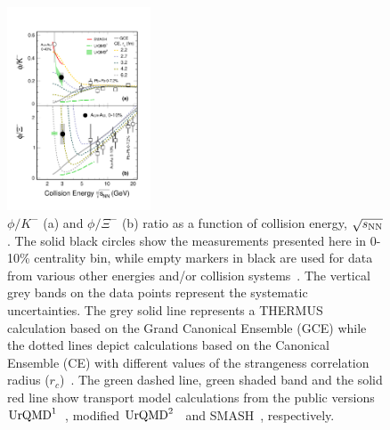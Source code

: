 \documentclass[aps,tightenlines,superscriptaddress,twocolumn]{revtex4-1}
\begin{document}
\begin{figure}
\centering
\hspace*{-4mm}
\includegraphics[width=0.38\textwidth]{fig4_phi_over_kminus_zoomin-eps-converted-to.pdf}
  \caption{$\phi/K^-$ (a) and $\phi/\Xi^-$ (b) ratio as a function of collision energy, $\sqrt{s_{\rm NN}}$. The solid black circles show the measurements presented here in 0-10\% centrality bin, while empty markers in black are used for data from various other energies and/or collision systems~\cite{E917_phi:2004,NA49_phi:2008,HADES_phi_ArKCl:2009,Xi_ArKCl_HADES:2009,FOPI_phi_NiNi:2015,FOPI_phi_AlAl:2016,HADES_phi_AuAu:2018,star_bes_strangeness:2020}. The vertical grey bands on the data points represent the systematic uncertainties. The grey solid line represents a THERMUS calculation based on the Grand Canonical Ensemble (GCE) while the dotted lines depict calculations based on the Canonical Ensemble (CE) with different values of the strangeness correlation radius ($r_c$)~\cite{THERMUS_WHEATON200984,Andronic_2018Naure}. The green dashed line, green shaded band and the solid red line show transport model calculations from the public versions $\textup{UrQMD}^{1}$~\cite{UrQMD_2:1998,urQMD:1999}, modified $\textup{UrQMD}^{2}$~\cite{Steinheimer_2015_UrQMD} and SMASH~\cite{Elfner_SMASH:2019}, respectively.}
\label{fig:phi2Kratio} 
\end{figure}
\end{document}
